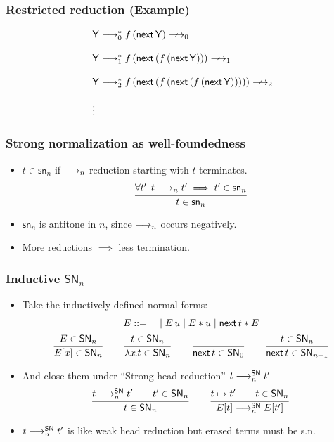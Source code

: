 \documentclass[t]{beamer}
\newcommand{\nex}{\tnext\,}
\newcommand{\Y}{\mathsf{Y}}
\newcommand{\redSN}{\red^\SN}
\renewcommand{\sn}{\mathsf{sn}}
\renewcommand{\SN}{\mathsf{SN}}
\begin{document}
\begin{frame}%
  \frametitle{Restricted reduction (Example)}
\[
  \begin{array}{l}
    \Y \red^*_0 f\, (\nex \Y) \longarrownot\longrightarrow_0 \\ \\
    \Y \red^*_1 f\, (\nex (f\, (\nex \Y))) \longarrownot\longrightarrow_1   \\ \\
    \Y \red^*_2 f\, (\nex (f\, (\nex (f\, (\nex \Y))))) \longarrownot\longrightarrow_2   \\ \\
    \vdots
  \end{array}
\]
\end{frame}


\begin{frame}%
  \frametitle{Strong normalization as well-foundedness}
  \begin{itemize}
  \item $t \in \sn_n$ if $\longrightarrow_n$ reduction starting with $t$
    terminates.
\[
  \ru{\forall t'.\, t \red_n t' \implies t' \in \sn_n
    }{t \in \sn_n}
\]
  \item $\sn_n$ is antitone in $n$, since $\longrightarrow_n$ occurs negatively.
  \item More reductions $\implies$ less termination.
  \end{itemize}
\end{frame}


\begin{frame}
  \frametitle{Inductive $\SN_n$}
  \vspace{-15pt}
  \begin{itemize}
  \item Take the inductively defined normal forms:
\begin{gather*}
  E ::= \_ \mid E\,u \mid E \ast u \mid \nex t \ast E\\
  \ru{E \in \SN_n
    }{E[x] \in \SN_n}
\qquad
  \ru{t\in\SN_n}{\lam x t \in \SN_n}
\qquad
  \ru{}{\nex t \in \SN_0}
\qquad
  \ru{t \in \SN_n
    }{\nex t \in \SN_{n+1}}
\end{gather*}
\item And close them under ``Strong head reduction'' $t \redSN_n t'$
\begin{gather*}
\ru{t \redSN_n t' \qquad t' \in \SN_n }
   {t \in \SN_n}\qquad
\ru{t \contr t' \qquad t \in \SN_n}
   {E[t] \redSN_n E[t']}
\end{gather*}
\item $t \redSN_n t'$ is like weak head reduction but erased terms must be s.n.
\end{itemize}
\end{frame}
\end{document}
